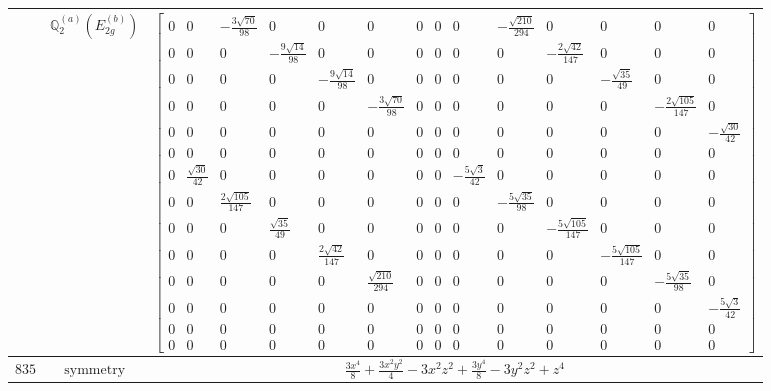 \documentclass[fleqn,8pt,landscape]{jsarticle}
\begin{document}
\begin{longtable}{ccc}
$  $ & $ \mathbb{Q}_{2}^{(a)}(E_{2g}^{(b)}) $ & $ \begin{bmatrix} 0 & 0 & - \frac{3 \sqrt{70}}{98} & 0 & 0 & 0 & 0 & 0 & 0 & - \frac{\sqrt{210}}{294} & 0 & 0 & 0 & 0 \\ 0 & 0 & 0 & - \frac{9 \sqrt{14}}{98} & 0 & 0 & 0 & 0 & 0 & 0 & - \frac{2 \sqrt{42}}{147} & 0 & 0 & 0 \\ 0 & 0 & 0 & 0 & - \frac{9 \sqrt{14}}{98} & 0 & 0 & 0 & 0 & 0 & 0 & - \frac{\sqrt{35}}{49} & 0 & 0 \\ 0 & 0 & 0 & 0 & 0 & - \frac{3 \sqrt{70}}{98} & 0 & 0 & 0 & 0 & 0 & 0 & - \frac{2 \sqrt{105}}{147} & 0 \\ 0 & 0 & 0 & 0 & 0 & 0 & 0 & 0 & 0 & 0 & 0 & 0 & 0 & - \frac{\sqrt{30}}{42} \\ 0 & 0 & 0 & 0 & 0 & 0 & 0 & 0 & 0 & 0 & 0 & 0 & 0 & 0 \\ 0 & \frac{\sqrt{30}}{42} & 0 & 0 & 0 & 0 & 0 & 0 & - \frac{5 \sqrt{3}}{42} & 0 & 0 & 0 & 0 & 0 \\ 0 & 0 & \frac{2 \sqrt{105}}{147} & 0 & 0 & 0 & 0 & 0 & 0 & - \frac{5 \sqrt{35}}{98} & 0 & 0 & 0 & 0 \\ 0 & 0 & 0 & \frac{\sqrt{35}}{49} & 0 & 0 & 0 & 0 & 0 & 0 & - \frac{5 \sqrt{105}}{147} & 0 & 0 & 0 \\ 0 & 0 & 0 & 0 & \frac{2 \sqrt{42}}{147} & 0 & 0 & 0 & 0 & 0 & 0 & - \frac{5 \sqrt{105}}{147} & 0 & 0 \\ 0 & 0 & 0 & 0 & 0 & \frac{\sqrt{210}}{294} & 0 & 0 & 0 & 0 & 0 & 0 & - \frac{5 \sqrt{35}}{98} & 0 \\ 0 & 0 & 0 & 0 & 0 & 0 & 0 & 0 & 0 & 0 & 0 & 0 & 0 & - \frac{5 \sqrt{3}}{42} \\ 0 & 0 & 0 & 0 & 0 & 0 & 0 & 0 & 0 & 0 & 0 & 0 & 0 & 0 \\ 0 & 0 & 0 & 0 & 0 & 0 & 0 & 0 & 0 & 0 & 0 & 0 & 0 & 0 \end{bmatrix} $ \\ \hline
$ 835 $ & $ \text{symmetry} $ & $ \frac{3 x^{4}}{8} + \frac{3 x^{2} y^{2}}{4} - 3 x^{2} z^{2} + \frac{3 y^{4}}{8} - 3 y^{2} z^{2} + z^{4} $ \\

\end{longtable}
\end{document}
